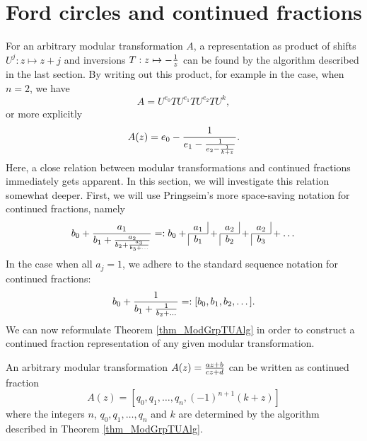 \section{Ford circles and continued fractions}

For an arbitrary modular transformation $A$, a representation as product of shifts $U^j: z \mapsto z+j$ and inversions $T: z \mapsto -\reci{z}$ can be found by the algorithm described in the last section. By writing out this product, for example in the case, when $n=2$, we have
\begin{equation*}
A = U^{e_0}T U^{e_1}T U^{e_2}T U^k,
\end{equation*}
or more explicitly
\begin{equation*}
A(z) = e_0 - \reci{e_1 - \reci{e_2 - \reci{k + z}}}.
\end{equation*}
Here, a close relation between modular transformations and continued fractions immediately gets apparent. In this section, we will investigate this relation somewhat deeper. 
First, we will use Pringseim's more space-saving notation for continued fractions, namely
\begin{equation}
\label{eqn_ConFracNotation}
b_0 + \frac{a_1}{b_1 + \frac{a_2}{b_2 + \frac{a_3}{b_3 + \dots}}} =: 
b_0 + \cfr{a_1}{b_1} + \cfr{a_2}{b_2} + \cfr{a_2}{b_3} + \dots
\end{equation}
In the case when all $a_j = 1$, we adhere to the standard sequence notation for continued fractions:
\begin{equation*}
b_0 + \reci{b_1 + \reci{b_2 + \dots}} =: [b_0,b_1,b_2,\dots].
\end{equation*}
We can now reformulate Theorem \ref{thm_ModGrpTUAlg} in order to construct a continued fraction representation of any given modular transformation.
\begin{corollary}
An arbitrary modular transformation $A(z) = \moebius{a}{b}{c}{d}{z}$ can be written as continued fraction
\begin{equation}
\label{eqn_ModTransConFrac}
A(z) = [q_0,q_1,\dots,q_n,(-1)^{n+1}(k+z)]
\end{equation}
where the integers $n$, $q_0,q_1,\dots,q_n$ and $k$ are determined by the algorithm described in Theorem \ref{thm_ModGrpTUAlg}.
\end{corollary}

